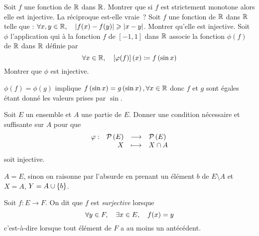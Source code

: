 \documentclass{magnolia}
\begin{document}
\begin{exos}
\exo Soit $f$ une fonction de $\mathbb{R}$ dans $\mathbb{R}$. Montrer que si $f$ est
  strictement monotone alors elle est injective. La réciproque est-elle vraie~?
\exo Soit $f$ une fonction de $\mathbb{R}$ dans $\mathbb{R}$ telle que :
  $\forall x,y\in\mathbb{R} ,\quad \left|f(x)-f(y)\right|\geqslant\left|x-y\right|$. Montrer qu'elle est
  injective.
\exo Soit $\phi$ l'application qui à la fonction $f$ de
  $[-1,1]$ dans $\mathbb{R}$ associe la fonction $\phi(f)$ de $\mathbb{R}$ dans $\mathbb{R}$
  définie par
  \[\forall x\in\mathbb{R} ,\quad \left[\varphi(f)\right](x)\coloneqq f\left(\sin x\right)\]
  Montrer que $\phi$ est injective.
  \begin{sol}
  $\phi(f)=\phi(g)$ implique $f\left(\sin x\right)=g\left(\sin x\right), \forall x\in\mathbb{R}$ donc $f$ et $g$ sont égales étant donné les valeurs prises par $\sin$.
  \end{sol}
\exo Soit $E$ un ensemble et $A$ une partie de $E$. Donner une condition
  nécessaire et suffisante sur $A$ pour que
  \[\begin{array}[t]{lrcl} \displaystyle{\varphi} : & \displaystyle{\mathcal{P}\left(E\right)} & \longrightarrow & \displaystyle{\mathcal{P}\left(E\right)} \\ & \displaystyle{X} & \longmapsto & \displaystyle{X\cap A} \end{array}\]
  soit injective.
  \begin{sol}
  $A=E$, sinon on raisonne par l'absurde en prenant un élément $b$ de $E\setminus A$ et $X=A$, $Y=A\cup \left\{b\right\}$.
  \end{sol}
\end{exos}


\begin{definition}[utile=-3]
Soit $f:E\to F$. On dit que $f$ est \emph{surjective} lorsque
\[\forall y\in F ,\quad \exists x\in E ,\quad f(x)=y\]
c'est-à-dire lorsque tout élément de $F$ a au moins un antécédent.
\end{definition}

\end{document}
